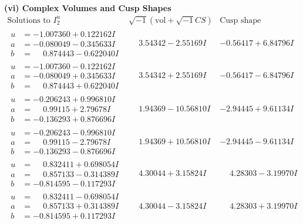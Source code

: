 \documentclass[1p]{elsarticle_modified}
\theoremstyle{definition}
\newcommand{\I}{\sqrt{-1}}
\begin{document}
\newpage\flushleft \textbf{(vi) Complex Volumes and Cusp Shapes}
$$\begin{array}{c|c|c}  
\text{Solutions to }I^u_{2}& \I (\text{vol} + \sqrt{-1}CS) & \text{Cusp shape}\\
 \hline 
\begin{aligned}
u &= -1.007360 + 0.122162 I \\
a &= -0.080049 - 0.345633 I \\
b &= \phantom{-}0.874443 - 0.622040 I\end{aligned}
 & \phantom{-}3.54342 - 2.55169 I & -0.56417 + 6.84796 I \\ \hline\begin{aligned}
u &= -1.007360 - 0.122162 I \\
a &= -0.080049 + 0.345633 I \\
b &= \phantom{-}0.874443 + 0.622040 I\end{aligned}
 & \phantom{-}3.54342 + 2.55169 I & -0.56417 - 6.84796 I \\ \hline\begin{aligned}
u &= -0.206243 + 0.996810 I \\
a &= \phantom{-}0.99115 + 2.79678 I \\
b &= -0.136293 + 0.876696 I\end{aligned}
 & \phantom{-}1.94369 - 10.56810 I & -2.94445 + 9.61134 I \\ \hline\begin{aligned}
u &= -0.206243 - 0.996810 I \\
a &= \phantom{-}0.99115 - 2.79678 I \\
b &= -0.136293 - 0.876696 I\end{aligned}
 & \phantom{-}1.94369 + 10.56810 I & -2.94445 - 9.61134 I \\ \hline\begin{aligned}
u &= \phantom{-}0.832411 + 0.698054 I \\
a &= \phantom{-}0.857133 - 0.314389 I \\
b &= -0.814595 - 0.117293 I\end{aligned}
 & \phantom{-}4.30044 + 3.15824 I & \phantom{-}4.28303 - 3.19970 I \\ \hline\begin{aligned}
u &= \phantom{-}0.832411 - 0.698054 I \\
a &= \phantom{-}0.857133 + 0.314389 I \\
b &= -0.814595 + 0.117293 I\end{aligned}
 & \phantom{-}4.30044 - 3.15824 I & \phantom{-}4.28303 + 3.19970 I \\ \hline\begin{aligned}

\end{aligned}
\end{array}$$
\end{document}
